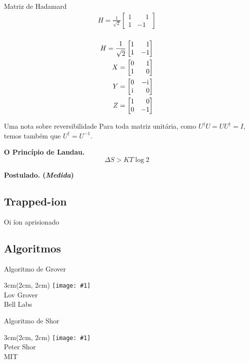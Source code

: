 \documentclass[t]{beamer}
\newcommand{\ii}{
	\rm{i}
}
\newcommand{\postulado}[1]{%
	\textbf{Postulado. (\emph{#1})\\}
}
\newcommand{\matriz}[4]{\ensuremath{
\left[\begin{matrix}
#1 & #2 \\
#3 & #4 
\end{matrix}\right]
}
}
\newcommand{\person}[6]{%
\begin{textblock*}{#4}(#5, #6)
	\texttt{[image: \#1]}\\
	#2\\
	{\small #3}
\end{textblock*}
}
\newcommand{\ps}{
	\phantom{-}
}
\newcommand{\HH}{\ensuremath{
	\frac{1}{\sqrt{2}}\matriz{1}{\ps 1}{1}{-1}
}}
\newcommand{\XX}{\ensuremath{
	\matriz{0}{\ps 1}{1}{\ps 0}
}}
\newcommand{\YY}{\ensuremath{
	\matriz{0}{-\ii}{\ii}{\ps 0}
}}
\newcommand{\ZZ}{\ensuremath{
	\matriz{1}{\ps 0}{0}{-1}
}}
\begin{document}
	\begin{frame}{\subsecname}
		Matriz de Hadamard
		\begin{align*}
			H = \HH\\
		\end{align*}
	\end{frame}
	
	\begin{frame}{\subsecname}
		\begin{align*}
			H = \HH\\
			X = \XX\\
			Y = \YY\\
			Z = \ZZ
		\end{align*}
	\end{frame}
	
	\begin{frame}{Uma nota sobre reversibilidade}
		Para toda matriz unitária, como $U^{\dagger} U = U U^{\dagger} = I$, temos também que $U^\dagger = U^{-1}$.
	
		\textbf{O Princípio de Landau.}\\
		
		$$\Delta S > K T \log 2$$
		
	\end{frame}	
	
	\begin{frame}{\subsecname}
		\postulado{Medida}
	\end{frame}
	
	\subsection{Trapped-ion}
	\begin{frame}{\subsecname}
		Oi íon aprisionado
	\end{frame}

	\subsection{Algoritmos}
	
	\begin{frame}{Algoritmo de Grover}
	
	\person{grover.jpg}{Lov Grover}{Bell Labs}{3cm}{2cm}{2cm}
		
	\end{frame}

	\begin{frame}{Algoritmo de Shor}
	
	\person{shor.jpg}{Peter Shor}{MIT}{3cm}{2cm}{2cm}
			
	\end{frame}
	
\end{document}
